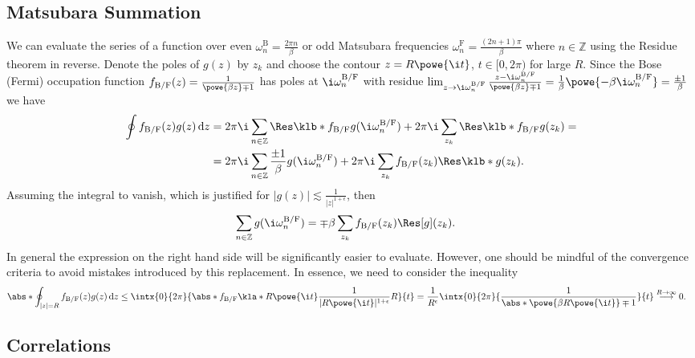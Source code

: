\documentclass[english, parskip=full]{scrartcl}
\renewcommand{\F}{\text{F}}
\newcommand{\B}{\text{B}}
\begin{document}
\subsection{Matsubara Summation}
We can evaluate the series of a function over even $\omega_n^\B = \frac{2\pi n}{\beta}$ or odd Matsubara frequencies $\omega_n^\F = \frac{(2n+1)\pi}{\beta}$ where $n\in\mathbb{Z}$ using the Residue theorem in reverse.
Denote the poles of $g(z)$ by $z_k$ and choose the contour $z=R\powe{\i t}$, $t\in [0,2\pi)$ for large $R$.
Since the Bose (Fermi) occupation function $f_{\B/\F}(z) = \frac{1}{\powe{\beta z} \mp 1}$ has poles at $\i\omega_n^{\B/\F}$ with residue $\lim_{z\rightarrow \i\omega_n^{\B/\F}} \frac{z - \i\omega_n^{\B/\F}}{\powe{\beta z } \mp 1} = \frac{1}{\beta} \powe{-\beta \i \omega_n^{\B/\F}} = \frac{\pm 1}{\beta}$ we have
\begin{align}
\oint f_{\B/\F}(z) g(z) \,\mathrm{d}z &= 2\pi\i \sum_{n\in\mathbb{Z}} \Res \klb*{f_{\B/\F} g}(\i\omega_n^{\B/\F}) + 2\pi\i \sum_{z_k} \Res \klb*{f_{\B/\F} g}(z_k) = \\
&= 2\pi\i \sum_{n\in\mathbb{Z}} \frac{\pm 1}{\beta} g(\i\omega_n^{\B/\F})  + 2\pi\i \sum_{z_k} f_{\B/\F}(z_k) \Res \klb*{g}(z_k).
\end{align}
Assuming the integral to vanish, which is justified for $|g(z)| \lesssim \frac{1}{|z|^{1+\epsilon}}$, then
\begin{align}
\sum_{n\in\mathbb{Z}} g(\i\omega_n^{\B/\F}) &= \mp \beta \sum_{z_k} f_{\B/\F}(z_k) \Res[g] (z_k). \label{eqn:sum g of i omega n BF is mp  beta sum fBF of zk times Res g of zk}
\end{align}
In general the expression on the right hand side will be significantly easier to evaluate.
However, one should be mindful of the convergence criteria to avoid mistakes introduced by this replacement.
In essence, we need to consider the inequality
\begin{align}
\abs*{\oint_{|z|=R} f_{\B/\F}(z) g(z) \,\mathrm{d}z} &\le \intx{0}{2\pi}{ \abs*{f_{\B/\F}\kla*{R\powe{\i t}} \frac{1}{|R\powe{\i t}|^{1+\epsilon}}} R }{t} = \frac{1}{R^\epsilon} \intx{0}{2\pi}{\frac{1}{ \abs*{\powe{\beta R \powe{\i t}} \mp 1} }}{t} \overset{R \rightarrow \infty}{\longrightarrow} 0.
\end{align}
\subsection{Correlations}
\end{document}
